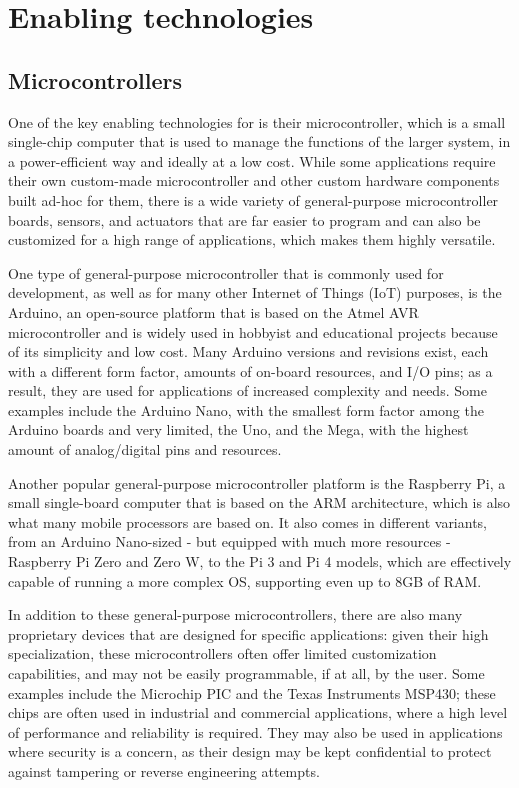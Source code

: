 \section{Enabling technologies}
\subsection{Microcontrollers}
One of the key enabling technologies for \ess is their microcontroller, which is a small single-chip computer that is used to manage the functions of the larger system, in a power-efficient way and ideally at a low cost. While some applications require their own custom-made microcontroller and other custom hardware components built ad-hoc for them, there is a wide variety of general-purpose microcontroller boards, sensors, and actuators that are far easier to program and can also be customized for a high range of applications, which makes them highly versatile.

One type of general-purpose microcontroller that is commonly used for \ess development, as well as for many other Internet of Things (IoT) purposes, is the Arduino, an open-source platform that is based on the Atmel AVR microcontroller and is widely used in hobbyist and educational projects because of its simplicity and low cost. Many Arduino versions and revisions exist, each with a different form factor, amounts of on-board resources, and I/O pins; as a result, they are used for applications of increased complexity and needs. Some examples include the Arduino Nano, with the smallest form factor among the Arduino boards and very limited, the Uno, and the Mega, with the highest amount of analog/digital pins and resources.

Another popular general-purpose microcontroller platform is the Raspberry Pi, a small single-board computer that is based on the ARM architecture, which is also what many mobile processors are based on. It also comes in different variants, from an Arduino Nano-sized - but equipped with much more resources - Raspberry Pi Zero and Zero W, to the Pi 3 and Pi 4 models, which are effectively capable of running a more complex OS, supporting even up to 8GB of RAM.

In addition to these general-purpose microcontrollers, there are also many proprietary devices that are designed for specific applications: given their high specialization, these microcontrollers often offer limited customization capabilities, and may not be easily programmable, if at all, by the user. Some examples include the Microchip PIC and the Texas Instruments MSP430; these chips are often used in industrial and commercial applications, where a high level of performance and reliability is required. They may also be used in applications where security is a concern, as their design may be kept confidential to protect against tampering or reverse engineering attempts.

